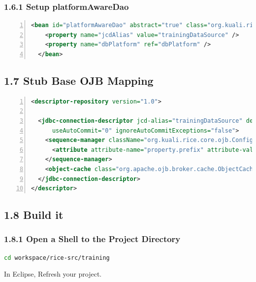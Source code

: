 \subsubsection*{1.6.1 Setup platformAwareDao}
\begin{lstlisting}[basicstyle=\scriptsize,numbers=left,language=xml,backgroundcolor=\color{ubergray},caption={Spring
    datasource setup src/main/resources/training/OJB-repository-bookstore.xml},frame=single,breaklines=true]
  <bean id="platformAwareDao" abstract="true" class="org.kuali.rice.kns.dao.impl.PlatformAwareDaoBaseOjb">
    <property name="jcdAlias" value="trainingDataSource" />
    <property name="dbPlatform" ref="dbPlatform" />
  </bean>
\end{lstlisting}

\subsection*{1.7 Stub Base OJB Mapping}
\begin{lstlisting}[basicstyle=\scriptsize,numbers=left,language=xml,backgroundcolor=\color{ubergray},caption={Stubbed
  OJB Descriptor file src/main/resources/OJB-repository-training.xml},frame=single,breaklines=true]
<descriptor-repository version="1.0">

  <jdbc-connection-descriptor jcd-alias="trainingDataSource" default-connection="false" jdbc-level="3.0" eager-release="false" batch-mode="false"
      useAutoCommit="0" ignoreAutoCommitExceptions="false">
    <sequence-manager className="org.kuali.rice.core.ojb.ConfigurableSequenceManager">
      <attribute attribute-name="property.prefix" attribute-value="datasource.ojb.sequenceManager" />
    </sequence-manager>
    <object-cache class="org.apache.ojb.broker.cache.ObjectCachePerBrokerImpl" />
  </jdbc-connection-descriptor>
</descriptor>
\end{lstlisting}

\subsection*{1.8 Build it}
\subsubsection*{1.8.1 Open a Shell to the Project Directory}
\begin{lstlisting}[basicstyle=\scriptsize,language=bash,backgroundcolor=\color{ubergray},caption={Change
  directory to the project in Linux},frame=single,breaklines=true]
cd workspace/rice-src/training
\end{lstlisting}
In Eclipse, Refresh your project.

